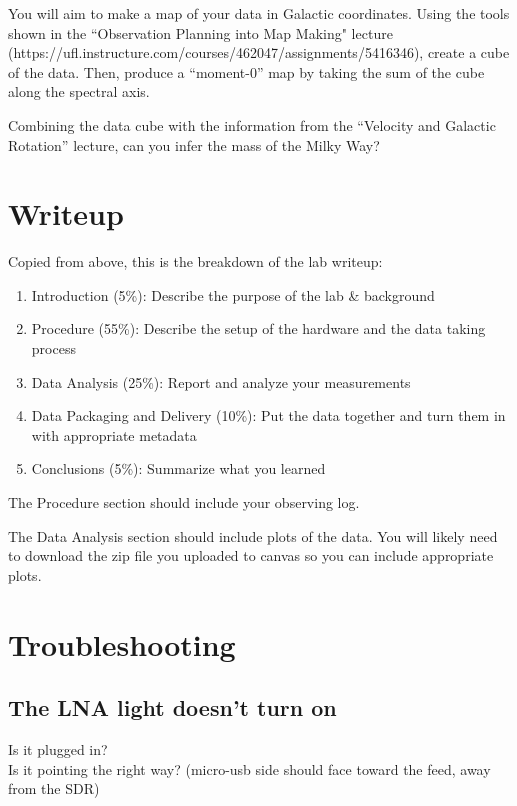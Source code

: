 \documentclass[11pt]{article}
\begin{document}
You will aim to make a map of your data in Galactic coordinates.
Using the tools shown in the ``Observation Planning into Map Making" lecture
(https://ufl.instructure.com/courses/462047/assignments/5416346),
create a cube of the data.
Then, produce a ``moment-0'' map by taking the sum of the cube along the spectral
axis.

Combining the data cube with the information from the ``Velocity and Galactic
Rotation'' lecture, can you infer the mass of the Milky Way?


\section{Writeup}

Copied from above, this is the breakdown of the lab writeup:
\begin{enumerate}
    \item Introduction (5\%): Describe the purpose of the lab \& background
    \item Procedure (55\%): Describe the setup of the hardware and the data taking process
    \item Data Analysis (25\%):  Report and analyze your measurements
    \item Data Packaging and Delivery (10\%): Put the data together and turn them in with appropriate metadata
    \item Conclusions (5\%): Summarize what you learned
\end{enumerate}


The Procedure section should include your observing log.

The Data Analysis section should include plots of the data.
You will likely need to download the zip file you uploaded to canvas
so you can include appropriate plots.






\section{Troubleshooting}
\label{sec:troubleshooting}
\subsection{The LNA light doesn't turn on}

Is it plugged in?\\

Is it pointing the right way?  (micro-usb side should face toward the feed, away from the SDR)\\
\end{document}
